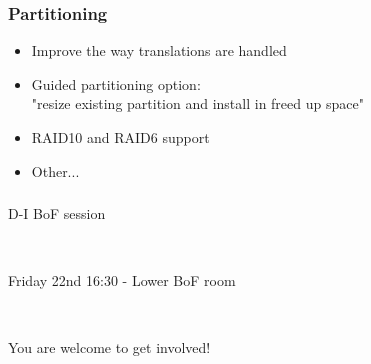 \documentclass{beamer}
\begin{document}
\begin{frame}
  \frametitle{Partitioning}
	\begin{itemize}
	\item
		Improve the way translations are handled
	\item
		Guided partitioning option: \\
		"resize existing partition and install in freed up space"
	\item
		RAID10 and RAID6 support
	\item
		Other...
	\end{itemize}
\end{frame}

\begin{frame}
  \frametitle{}
	\begin{huge}
		D-I BoF session

		\ 

		Friday 22nd 16:30 - Lower BoF room

		\ 

		You are welcome to get involved!
	\end{huge}
\end{frame}
\end{document}
